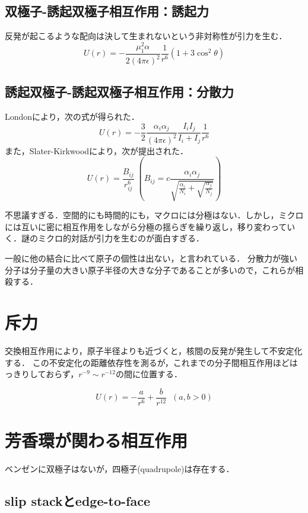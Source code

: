 \documentclass[uplatex, dvipdfmx]{jsreport}
\begin{document}
\subsection{双極子-誘起双極子相互作用：誘起力}

反発が起こるような配向は決して生まれないという非対称性が引力を生む．
\[ U(r) = -\frac{\mu_1^2\alpha}{2(4\pi\epsilon)^2}\frac{1}{r^6}(1+3\cos^2\theta) \]

\subsection{誘起双極子-誘起双極子相互作用：分散力}
Londonにより，次の式が得られた．
\[ U(r) = -\frac{3}{2}\frac{\alpha_i\alpha_j}{(4\pi\epsilon)^2}\frac{I_iI_j}{I_i+I_j}\frac{1}{r^6} \]
また，Slater-Kirkwoodにより，次が提出された．
\[ U(r) = \frac{B_{ij}}{r^6_{ij}}\;\left(B_{ij}=c\frac{\alpha_i\alpha_j}{\sqrt{\frac{\alpha_i}{N_i}+\sqrt{\frac{\alpha_j}{N_j}}}}\right) \]

不思議すぎる．空間的にも時間的にも，マクロには分極はない．しかし，ミクロには互いに密に相互作用をしながら分極の揺らぎを繰り返し，移り変わっていく．謎のミクロ的対話が引力を生むのが面白すぎる．

一般に他の結合に比べて原子の個性は出ない，と言われている．
分散力が強い分子は分子量の大きい原子半径の大きな分子であることが多いので，これらが相殺する．

\section{斥力}

交換相互作用により，原子半径よりも近づくと，核間の反発が発生して不安定化する．
この不安定化の距離依存性を測るが，これまでの分子間相互作用ほどはっきりしておらず，$r^{-9}\sim r^{-12}$の間に位置する．
\begin{theory}
    \[ U(r) = -\frac{a}{r^6} + \frac{b}{r^{12}}\;\;(a,b>0) \]
\end{theory}

\section{芳香環が関わる相互作用}
ベンゼンに双極子はないが，四極子(quadrupole)は存在する．

\subsection{slip stackとedge-to-face}
\end{document}
